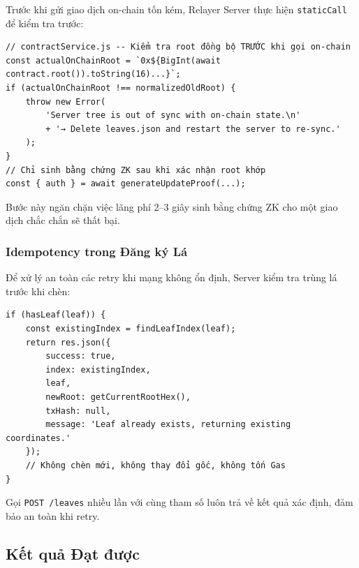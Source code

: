 \documentclass[../DoAn.tex]{subfiles}
\begin{document}
Trước khi gửi giao dịch on-chain tốn kém, Relayer Server thực hiện \texttt{staticCall} để kiểm tra trước:

\begin{verbatim}
// contractService.js -- Kiểm tra root đồng bộ TRƯỚC khi gọi on-chain
const actualOnChainRoot = `0x${BigInt(await contract.root()).toString(16)...}`;
if (actualOnChainRoot !== normalizedOldRoot) {
    throw new Error(
        'Server tree is out of sync with on-chain state.\n'
        + '→ Delete leaves.json and restart the server to re-sync.'
    );
}
// Chỉ sinh bằng chứng ZK sau khi xác nhận root khớp
const { auth } = await generateUpdateProof(...);
\end{verbatim}

Bước này ngăn chặn việc lãng phí 2--3 giây sinh bằng chứng ZK cho một giao dịch chắc chắn sẽ thất bại.

\subsubsection{Idempotency trong Đăng ký Lá}

Để xử lý an toàn các retry khi mạng không ổn định, Server kiểm tra trùng lá trước khi chèn:

\begin{verbatim}
if (hasLeaf(leaf)) {
    const existingIndex = findLeafIndex(leaf);
    return res.json({
        success: true,
        index: existingIndex,
        leaf,
        newRoot: getCurrentRootHex(),
        txHash: null,
        message: 'Leaf already exists, returning existing coordinates.'
    });
    // Không chèn mới, không thay đổi gốc, không tốn Gas
}
\end{verbatim}

Gọi \texttt{POST /leaves} nhiều lần với cùng tham số luôn trả về kết quả xác định, đảm bảo an toàn khi retry.

\subsection{Kết quả Đạt được}
\label{subsec:sync_result}
\end{document}
